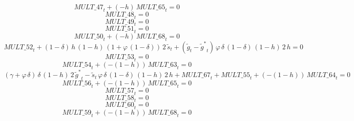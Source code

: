 \begin{dmath}
{MULT\_47}_{t}+\left(-{{h}}\right)\, {MULT\_65}_{t}=0
\end{dmath}
\begin{dmath}
{MULT\_48}_{t}=0
\end{dmath}
\begin{dmath}
{MULT\_49}_{t}=0
\end{dmath}
\begin{dmath}
{MULT\_51}_{t}=0
\end{dmath}
\begin{dmath}
{MULT\_50}_{t}+\left(-{{h}}\right)\, {MULT\_68}_{t}=0
\end{dmath}
\begin{dmath}
{MULT\_52}_{t}+\left(1-{{\delta}}\right)\, {{h}}\, \left(1-{{h}}\right)\, \left(1+{{\varphi}}\, \left(1-{{\delta}}\right)\right)\, 2\, {{\tilde s}}_{t}+\left({{\tilde g}}_{t}-{{\tilde g^*}}_{t}\right)\, {{\varphi}}\, {{\delta}}\, \left(1-{{\delta}}\right)\, \left(1-{{h}}\right)\, 2\, {{h}}=0
\end{dmath}
\begin{dmath}
{MULT\_53}_{t}=0
\end{dmath}
\begin{dmath}
{MULT\_54}_{t}+\left(-\left(1-{{h}}\right)\right)\, {MULT\_63}_{t}=0
\end{dmath}
\begin{dmath}
\left({{\gamma}}+{{\varphi}}\, {{\delta}}\right)\, {{\delta}}\, \left(1-{{h}}\right)\, 2\, {{\tilde g^*}}_{t}-{{\tilde s}}_{t}\, {{\varphi}}\, {{\delta}}\, \left(1-{{\delta}}\right)\, \left(1-{{h}}\right)\, 2\, {{h}}+{MULT\_67}_{t}+{MULT\_55}_{t}+\left(-\left(1-{{h}}\right)\right)\, {MULT\_64}_{t}=0
\end{dmath}
\begin{dmath}
{MULT\_56}_{t}+\left(-\left(1-{{h}}\right)\right)\, {MULT\_65}_{t}=0
\end{dmath}
\begin{dmath}
{MULT\_57}_{t}=0
\end{dmath}
\begin{dmath}
{MULT\_58}_{t}=0
\end{dmath}
\begin{dmath}
{MULT\_60}_{t}=0
\end{dmath}
\begin{dmath}
{MULT\_59}_{t}+\left(-\left(1-{{h}}\right)\right)\, {MULT\_68}_{t}=0
\end{dmath}

